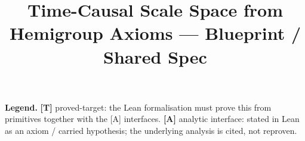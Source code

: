 \documentclass[11pt]{report}
\title{Time-Causal Scale Space from Hemigroup Axioms --- Blueprint / Shared Spec}
\author{}
\date{}
\begin{document}
\maketitle

\noindent\textbf{Legend.}\quad
\textbf{[T]} \textsf{proved-target}: the Lean formalisation must prove this from primitives together with
the [A] interfaces.\quad
\textbf{[A]} \textsf{analytic interface}: stated in Lean as an axiom / carried hypothesis; the underlying
analysis is cited, not reproven.

\tableofcontents


\end{document}
